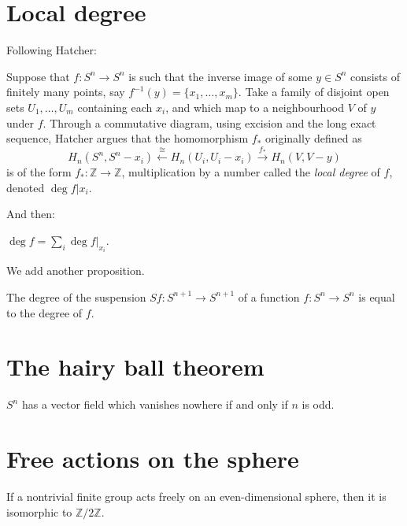 \section{Local degree}
\label{section-local-degree}
\label{subsec:grloc}

Following Hatcher:

\begin{definition}
Suppose that $f:S^n\to S^n$ is such that the
inverse image of
some $y\in S^n$ consists of finitely many
points, say
$f^{-1}(y)=\{x_1,\ldots,x_m\}$. Take a family
of disjoint
open sets $U_1,\ldots,U_m$ containing each
$x_i$, and which
map to a neighbourhood $V$ of $y$ under $f$.
Through a
commutative diagram, using excision and the
long exact
sequence, Hatcher argues that the
homomorphism $f_*$
originally defined as
$$
H_n(S^n,S^n-x_i)\xleftarrow{\cong}
H_n(U_i,U_i-x_i)\xrightarrow{f_*}H_n(V,V-y)
$$
is of the form $f_*:\mathbb{Z}\to\mathbb{Z}$,
multiplication by a number
called the \emph{local degree} of $f$,
denoted
$\deg f|x_i$.
\end{definition}

And then:

\begin{theorem}
$\deg f=\sum_i\deg f|_{x_i}$.
\end{theorem}

We add another proposition.

\begin{proposition}
The degree of the suspension $Sf:S^{n+1}\to
S^{n+1}$ of a
function $f:S^n\to S^n$ is equal to the
degree of $f$.
\end{proposition}
\section{The hairy ball theorem}
\label{section-hairy-ball}

\begin{theorem}
$S^n$ has a vector field which vanishes
nowhere if and only
if $n$ is odd.
\end{theorem}
\section{Free actions on the sphere}
\label{section-free-sphere-actions}

\begin{theorem}
If a nontrivial finite group acts freely on
an
even-dimensional sphere, then it is
isomorphic
to $\mathbb{Z}/2\mathbb{Z}$.
\end{theorem}
